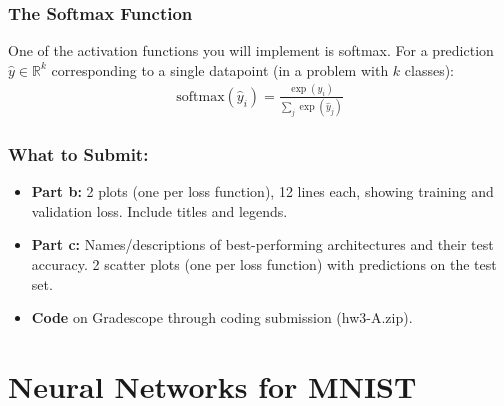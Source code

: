 \documentclass{article}
\begin{document}
\begin{aprob}
    \subsubsection*{The Softmax Function}
    One of the activation functions you will implement is softmax. For a prediction $\hat{y} \in \mathbb{R}^k$ corresponding to a single datapoint (in a problem with $k$ classes):
    \begin{align*}
        \text{softmax}(\hat{y}_i) = \frac{\exp(\hat{y}_i)}{\sum_j \exp(\hat{y}_j)}
    \end{align*}

    \subsubsection*{What to Submit:}
    \begin{itemize}
        \item \textbf{Part b:} 2 plots (one per loss function), 12 lines each, showing training and validation loss. Include titles and legends.
        \item \textbf{Part c:} Names/descriptions of best-performing architectures and their test accuracy. 2 scatter plots (one per loss function) with predictions on the test set.
        \item \textbf{Code} on Gradescope through coding submission (hw3-A.zip).
    \end{itemize}
\end{aprob}

\section*{Neural Networks for MNIST}
\end{document}
